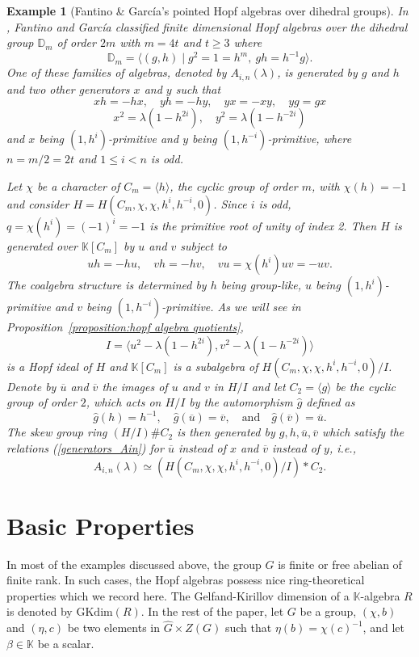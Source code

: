 \documentclass[11pt, twoside]{amsart}
\newtheorem{example}[theorem]{Example}
\theoremstyle{definition}
\newcommand{\KK}{\mathbb{K}}
\newcommand{\DD}{\mathbb{D}}
\newcommand{\ou}{\overline{u}}
\newcommand{\ov}{\overline{v}}
\begin{document}
\begin{example}[Fantino \& Garc\'{i}a's pointed Hopf algebras over dihedral groups]
    In \cite[Theorem B]{Fantino-Garcia}, Fantino and Garc\'{i}a classified finite dimensional Hopf algebras over the dihedral group $\DD_m$ of order $2m$ with $m = 4t$ and $t \geq 3$ where 
    \[\DD_m = \langle (g, h) \mid g^2 = 1 = h^m,\ gh = h^{-1}g\rangle.\]
    One of these families of algebras, denoted by $A_{i,n}(\lambda)$, is generated by $g$ and $h$ and two other generators $x$ and $y$ such that 
    \begin{equation}\label{generators_Ain}
    xh = -hx,\quad yh = -hy,\quad yx = -xy,\quad yg = gx
    \end{equation}
    \[x^2 = \lambda(1 - h^{2i}),\quad y^2 = \lambda(1 - h^{-2i})\]
    and $x$ being $(1, h^i)$-primitive and $y$ being $(1, h^{-i})$-primitive, where $n = m/2 = 2t$ and $1 \leq i < n$ is odd. 

    Let $\chi$ be a character of $C_m = \langle h \rangle$, the cyclic group of order $m$, with $\chi(h) = -1$ and consider $H = H(C_m, \chi, \chi, h^i, h^{-i}, 0)$. Since $i$ is odd, $q = \chi(h^i) = (-1)^i = -1$ is the primitive root of unity of index 2. Then $H$ is generated over $\KK[C_m]$ by $u$ and $v$ subject to 
    \[uh = -hu,\quad vh = -hv,\quad vu = \chi(h^i)uv = -uv.\]
    The coalgebra structure is determined by $h$ being group-like, $u$ being $(1,h^i)$-primitive and $v$ being $(1, h^{-i})$-primitive. As we will see in Proposition~\ref{proposition:hopf algebra quotients},
    \[I = \langle u^2 - \lambda(1 - h^{2i}), v^2 - \lambda(1 - h^{-2i})\rangle\]
    is a Hopf ideal of $H$ and $\KK[C_m]$ is a subalgebra of $H(C_m, \chi, \chi, h^i, h^{-i}, 0)/I$. Denote by $\ou$ and $\ov$ the images of $u$ and $v$ in $H/I$ and let $C_2 = \langle g \rangle$ be the cyclic group of order $2$, which acts on $H/I$ by the automorphism $\hat{g}$ defined as 
    \[\hat{g}(h) = h^{-1}, \quad \hat{g}(\ou) = \ov, \quad \text{and} \quad \hat{g}(\ov) = \ou.\]
    The skew group ring $(H/I) \# C_2$ is then generated by $g, h, \ou, \ov$ which satisfy the relations (\ref{generators_Ain}) for $\ou$ instead of $x$ and $\ov$ instead of $y$, i.e.,
    \[A_{i,n}(\lambda) \simeq \left(H(C_m, \chi, \chi, h^i, h^{-i}, 0)/I\right) * C_2.\]
\end{example}
%
\section{Basic Properties}
In most of the examples discussed above, the group $G$ is finite or free abelian of finite rank. In such cases, the Hopf algebras possess nice ring-theoretical properties which we record here. The Gelfand-Kirillov dimension of a $\KK$-algebra $R$ is denoted by $\mathrm{GKdim}(R)$. In the rest of the paper, let $G$ be a group, $(\chi, b)$ and $(\eta, c)$ be two elements in $\widehat{G}\times Z(G)$ such that $\eta(b) = \chi(c)^{-1}$, and let $\beta \in \KK$ be a scalar.
\end{document}

